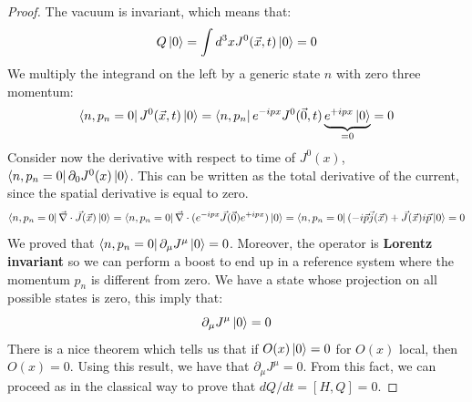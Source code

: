 \documentclass[../main.tex]{subfiles}
\begin{document}
\begin{proof}
The vacuum is invariant, which means that:
\[
Q\ket{0}=\int d^3xJ^0(\Vec{x},t)\ket{0}=0
\]
We multiply the integrand on the left by a generic state $n$ with zero three momentum:
\[
\bra{n,p_n=0}J^0(\Vec{x},t)\ket{0}=\bra{n,p_n}e^{-ipx}J^0(\Vec{0},t)\underbrace{e^{+ipx}\ket{0}}_{=0}=0
\]
Consider now the derivative with respect to time of $J^0(x)$, $\bra{n,p_n=0}\partial_0J^0(x)\ket{0}$. This can be written as the total derivative of the current, since the spatial derivative is equal to zero.
\[
\bra{n,p_n=0}\Vec{\nabla}\cdot\Vec{J}(\Vec{x})\ket{0}=\bra{n,p_n=0}\Vec{\nabla}\cdot(e^{-ipx}\Vec{J}(\Vec{0})e^{+ipx})\ket{0}=\bra{n,p_n=0}(-i\Vec{p}\Vec{j}(\Vec{x})+\Vec{J}(\Vec{x})i\Vec{p}\ket{0}=0
\]
We proved that $\bra{n,p_n=0}\partial_\mu J^\mu\ket{0}=0$. Moreover, the operator is \textbf{Lorentz invariant} so we can perform a boost to end up in a reference system where the momentum $p_n$ is different from zero. We have a state whose projection on all possible states is zero, this imply that:
\[
\partial_\mu J^\mu\ket{0}=0
\]
There is a nice theorem which tells us that if $O(x)\ket{0}=0$ for $O(x)$ local, then $O(x)=0$. Using this result, we have that $\partial_\mu J^\mu=0$. From this fact, we can proceed as in the classical way to prove that $dQ/dt=[H,Q]=0$.
\end{proof}
\end{document}
